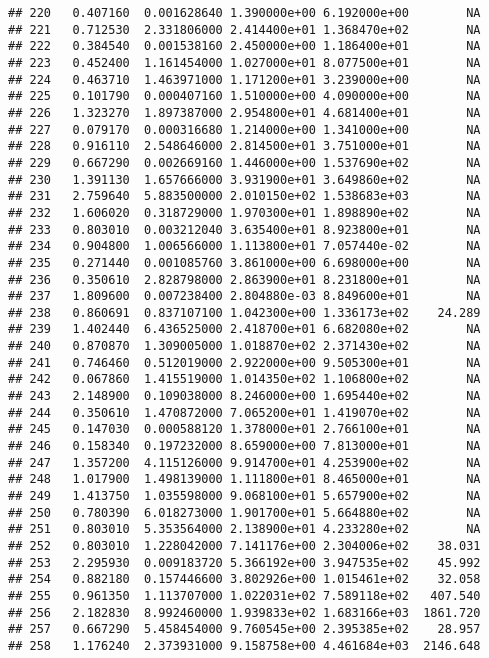\documentclass[
]{article}
\begin{document}
\begin{verbatim}
## 220   0.407160  0.001628640 1.390000e+00 6.192000e+00        NA
## 221   0.712530  2.331806000 2.414400e+01 1.368470e+02        NA
## 222   0.384540  0.001538160 2.450000e+00 1.186400e+01        NA
## 223   0.452400  1.161454000 1.027000e+01 8.077500e+01        NA
## 224   0.463710  1.463971000 1.171200e+01 3.239000e+00        NA
## 225   0.101790  0.000407160 1.510000e+00 4.090000e+00        NA
## 226   1.323270  1.897387000 2.954800e+01 4.681400e+01        NA
## 227   0.079170  0.000316680 1.214000e+00 1.341000e+00        NA
## 228   0.916110  2.548646000 2.814500e+01 3.751000e+01        NA
## 229   0.667290  0.002669160 1.446000e+00 1.537690e+02        NA
## 230   1.391130  1.657666000 3.931900e+01 3.649860e+02        NA
## 231   2.759640  5.883500000 2.010150e+02 1.538683e+03        NA
## 232   1.606020  0.318729000 1.970300e+01 1.898890e+02        NA
## 233   0.803010  0.003212040 3.635400e+01 8.923800e+01        NA
## 234   0.904800  1.006566000 1.113800e+01 7.057440e-02        NA
## 235   0.271440  0.001085760 3.861000e+00 6.698000e+00        NA
## 236   0.350610  2.828798000 2.863900e+01 8.231800e+01        NA
## 237   1.809600  0.007238400 2.804880e-03 8.849600e+01        NA
## 238   0.860691  0.837107100 1.042300e+00 1.336173e+02    24.289
## 239   1.402440  6.436525000 2.418700e+01 6.682080e+02        NA
## 240   0.870870  1.309005000 1.018870e+02 2.371430e+02        NA
## 241   0.746460  0.512019000 2.922000e+00 9.505300e+01        NA
## 242   0.067860  1.415519000 1.014350e+02 1.106800e+02        NA
## 243   2.148900  0.109038000 8.246000e+00 1.695440e+02        NA
## 244   0.350610  1.470872000 7.065200e+01 1.419070e+02        NA
## 245   0.147030  0.000588120 1.378000e+01 2.766100e+01        NA
## 246   0.158340  0.197232000 8.659000e+00 7.813000e+01        NA
## 247   1.357200  4.115126000 9.914700e+01 4.253900e+02        NA
## 248   1.017900  1.498139000 1.111800e+01 8.465000e+01        NA
## 249   1.413750  1.035598000 9.068100e+01 5.657900e+02        NA
## 250   0.780390  6.018273000 1.901700e+01 5.664880e+02        NA
## 251   0.803010  5.353564000 2.138900e+01 4.233280e+02        NA
## 252   0.803010  1.228042000 7.141176e+00 2.304006e+02    38.031
## 253   2.295930  0.009183720 5.366192e+00 3.947535e+02    45.992
## 254   0.882180  0.157446600 3.802926e+00 1.015461e+02    32.058
## 255   0.961350  1.113707000 1.022031e+02 7.589118e+02   407.540
## 256   2.182830  8.992460000 1.939833e+02 1.683166e+03  1861.720
## 257   0.667290  5.458454000 9.760545e+00 2.395385e+02    28.957
## 258   1.176240  2.373931000 9.158758e+00 4.461684e+03  2146.648

\end{verbatim}
\end{document}
